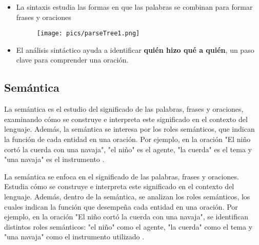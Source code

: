 \begin{itemize}
\item La sintaxis estudia las formas en que las palabras se combinan para formar frases y oraciones \cite{JohnsonMLSS}
\begin{figure}[h]
\texttt{[image: pics/parseTree1.png]}
\end{figure}
\item El análisis sintáctico ayuda a identificar \textbf{quién hizo qué a quién}, un paso clave para comprender una oración.
\end{itemize}


\subsection{Semántica}

La semántica es el estudio del significado de las palabras, frases y oraciones, examinando cómo se construye e interpreta este significado en el contexto del lenguaje. Además, la semántica se interesa por los roles semánticos, que indican la función de cada entidad en una oración. Por ejemplo, en la oración "El niño cortó la cuerda con una navaja", "el niño" es el agente, "la cuerda" es el tema y "una navaja" es el instrumento \cite{JohnsonMLSS}.

La semántica se enfoca en el significado de las palabras, frases y oraciones. Estudia cómo se construye e interpreta este significado en el contexto del lenguaje. Además, dentro de la semántica, se analizan los roles semánticos, los cuales indican la función que desempeña cada entidad en una oración. Por ejemplo, en la oración "El niño cortó la cuerda con una navaja", se identifican distintos roles semánticos: "el niño" como el agente, "la cuerda" como el tema y "una navaja" como el instrumento utilizado \cite{JohnsonMLSS}.


